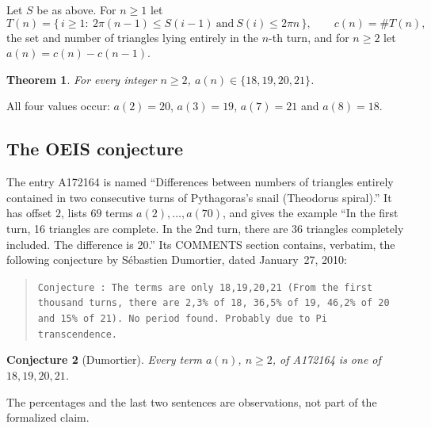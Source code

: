 \documentclass[11pt]{amsart}
\theoremstyle{plain}
\newtheorem{theorem}{Theorem}
\newtheorem{conjecture}[theorem]{Conjecture}
\theoremstyle{definition}
\begin{document}
Let $S$ be as above. For $n\ge1$ let
\[
  T(n)=\{\,i\ge1:\ 2\pi(n-1)\le S(i-1)\ \text{and}\ S(i)\le2\pi n\,\},\qquad c(n)=\#T(n),
\]
the set and number of triangles lying entirely in the $n$-th turn, and for $n\ge2$ let $a(n)=c(n)-c(n-1)$.

\begin{theorem}\label{thm:main}
For every integer $n\ge2$, $a(n)\in\{18,19,20,21\}$.
\end{theorem}

All four values occur: $a(2)=20$, $a(3)=19$, $a(7)=21$ and $a(8)=18$.

\subsection*{The OEIS conjecture}
The entry A172164 \cite{A172164} is named ``Differences between numbers of triangles entirely contained in two consecutive turns of Pythagoras's snail (Theodorus spiral).'' It has offset $2$, lists $69$ terms $a(2),\dots,a(70)$, and gives the example ``In the first turn, 16 triangles are complete. In the 2nd turn, there are 36 triangles completely included. The difference is 20.''
Its COMMENTS section contains, verbatim, the following conjecture by S\'ebastien Dumortier, dated January~27, 2010:
\begin{quote}\small
\texttt{Conjecture : The terms are only 18,19,20,21 (From the first thousand turns, there are 2,3\% of 18, 36,5\% of 19, 46,2\% of 20 and 15\% of 21). No period found. Probably due to Pi transcendence.}
\end{quote}

\begin{conjecture}[Dumortier]\label{conj}
Every term $a(n)$, $n\ge2$, of A172164 is one of $18,19,20,21$.
\end{conjecture}

The percentages and the last two sentences are observations, not part of the formalized claim.
\end{document}
